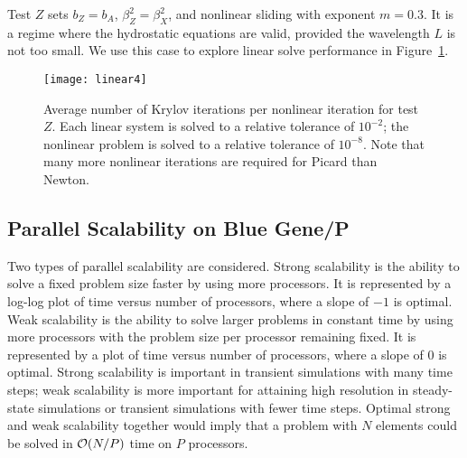 Test $Z$ sets $b_Z = b_A$, $\beta_Z^2 = \beta_X^2$, and nonlinear sliding with exponent $m=0.3$. It is a regime where the hydrostatic equations are valid, provided the wavelength $L$ is not too small.  We use this case to explore linear solve performance in Figure~\ref{fig:linear}.

\begin{figure}
  \centering\texttt{[image: linear4]}
  \caption{Average number of Krylov iterations per nonlinear iteration for test $Z$.
    Each linear system is solved to a relative tolerance of $10^{-2}$; the nonlinear problem is solved to a relative tolerance of $10^{-8}$.
    Note that many more nonlinear iterations are required for Picard than Newton.}\label{fig:linear}
\end{figure}

\subsection{Parallel Scalability on Blue Gene/P}\label{sec:pscaling}
Two types of parallel scalability are considered.
Strong scalability is the ability to solve a fixed problem size faster by using more processors.
It is represented by a log-log plot of time versus number of processors, where a slope of $-1$ is optimal.
Weak scalability is the ability to solve larger problems in constant time by using more processors with the problem size per processor remaining fixed.
It is represented by a plot of time versus number of processors, where a slope of $0$ is optimal.
Strong scalability is important in transient simulations with many time steps; weak scalability is more important for attaining high resolution in steady-state simulations or transient simulations with fewer time steps.
Optimal strong and weak scalability together would imply that a problem with $N$ elements could be solved in ${\mathcal{O}}(N/P)$ time on $P$ processors.


